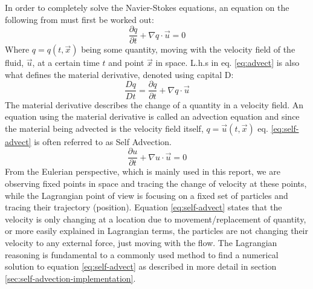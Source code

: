 In order to completely solve the Navier-Stokes equations, an equation on the following from must first be worked out:
\begin{equation}\label{eq:advect}\frac{\partial q}{\partial t} +\nabla q \cdot \vec{u}= 0\end{equation}
Where \begin{math}q= q(t,\vec{x})\end{math} being some quantity, moving with the velocity field of the fluid, \begin{math}\vec{u}\end{math}, at a certain time \begin{math}t\end{math} and point \begin{math}\vec{x}\end{math} in space. L.h.s in eq. \ref{eq:advect} is also what defines the material derivative, denoted using capital D:
\begin{equation}\frac{Dq}{Dt} = \frac{\partial q}{\partial t} +\nabla q \cdot \vec{u}\end{equation}
The material derivative describes the change of a quantity in a velocity field. An equation using the material derivative is called an advection equation and since the material being advected is the velocity field itself, \begin{math}q = \vec{u}(t,\vec{x})\end{math} eq. \ref{eq:self-advect} is often referred to as Self Advection.
\begin{equation}\label{eq:self-advect}\frac{\partial u}{\partial t} +\nabla u \cdot \vec{u}= 0\end{equation}
From the Eulerian perspective, which is mainly used in this report, we are observing fixed points in space and tracing the change of velocity at these points, while the Lagrangian point of view is focusing on a fixed set of particles and tracing their trajectory (position). Equation \ref{eq:self-advect} states that the velocity is only changing at a location due to movement/replacement of quantity, or more easily explained in Lagrangian terms, the particles are not changing their velocity to any external force, just moving with the flow. The Lagrangian reasoning is fundamental to a commonly used method to find a numerical solution to equation \ref{eq:self-advect} as described in more detail in section \ref{sec:self-advection-implementation}.
